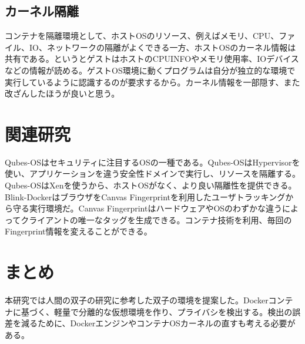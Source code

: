 \documentclass[a4paper,twocolumn,10pt]{jarticle}
\begin{document}
\subsection{カーネル隔離}
コンテナを隔離環境として、ホストOSのリソース、例えばメモリ、CPU、ファイル、IO、ネットワークの隔離がよくできる一方、ホストOSのカーネル情報は共有である。というとゲストはホストのCPUINFOやメモリ使用率、IOデバイスなどの情報が読める。ゲストOS環境に動くプログラムは自分が独立的な環境で実行しているように認識するのが要求するから。カーネル情報を一部隠す、また改ざんしたほうが良いと思う。


\section{関連研究}
Qubes-OS\cite{qubes}はセキュリティに注目するOSの一種である。Qubes-OSはHypervisorを使い、アプリケーションを違う安全性ドメインで実行し、リソースを隔離する。Qubes-OSはXenを使うから、ホストOSがなく、より良い隔離性を提供できる。
Blink-Docker\cite{blink}はブラウザをCanvas Fingerprintを利用したユーザトラッキングから守る実行環境だ。Canvas FingerprintはハードウェアやOSのわずかな違うによってクライアントの唯一なタッグを生成できる。コンテナ技術を利用、毎回のFingerprint情報を変えることができる。




\section{まとめ}
本研究では人間の双子の研究に参考した双子の環境を提案した。Dockerコンテナに基づく、軽量で分離的な仮想環境を作り、プライバシを検出する。検出の誤差を減るために、DockerエンジンやコンテナOSカーネルの直すも考える必要がある。



\end{document}
